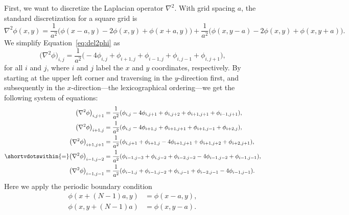 First, we want to discretize the Laplacian operator \(\nabla^2\).
With grid spacing \(a\), the standard discretization for a square grid is
%
\begin{equation}\label{eq:del2phi}
    \nabla^2 \phi(x, y) =
    \frac{ 1 }{ a^2 } \bigl(\phi(x - a, y) - 2 \phi(x, y) + \phi(x + a, y)\bigr) +
    \frac{ 1 }{ a^2 } \bigl(\phi(x, y - a) - 2 \phi(x, y) + \phi(x, y + a)\bigr).
\end{equation}
%
We simplify Equation~\eqref{eq:del2phi} as
%
\begin{equation}\label{eq:del2phisim}
    \bigl(\nabla^2 \phi\bigr)_{i, j} = \frac{1}{a^2} \bigl(
    -4 \phi_{i, j} + \phi_{i+1, j} + \phi_{i-1, j} + \phi_{i, j-1} + \phi_{i, j+1}
    \bigr),
\end{equation}
%
for all \(i\) and \(j\),
where \(i\) and \(j\) label the \(x\) and \(y\) coordinates, respectively.
By starting at the upper left corner and traversing in the \(y\)-direction first, and
subsequently in the \(x\)-direction---the lexicographical ordering---we get the following
system of equations:
%
\begin{align}
    \bigl(\nabla^2 \phi\bigr)_{i, j+1}   & = \frac{1}{a^2} (
    \phi_{i, j} - 4\phi_{i, j+1} + \phi_{i, j+2} + \phi_{i+1, j+1} + \phi_{i-1, j+1}
    ),                                                       \\
    \bigl(\nabla^2 \phi\bigr)_{i+1, j}   & = \frac{1}{a^2} (
    \phi_{i, j} - 4\phi_{i+1, j} + \phi_{i+1, j+1} + \phi_{i+1, j-1} + \phi_{i+2, j}
    ),                                                       \\
    \bigl(\nabla^2 \phi\bigr)_{i+1, j+1} & = \frac{1}{a^2} (
    \phi_{i, j+1} + \phi_{i+1, j} - 4\phi_{i+1, j+1} + \phi_{i+1, j+2} + \phi_{i+2, j+1}
    ),                                                       \\
    \shortvdotswithin{=} %
    \bigl(\nabla^2 \phi\bigr)_{i-1, j-2} & = \frac{1}{a^2} (
    \phi_{i-1, j-3} + \phi_{i, j-2} + \phi_{i-2, j-2} - 4\phi_{i-1, j-2} + \phi_{i-1, j-1}
    ),                                                       \\
    \bigl(\nabla^2 \phi\bigr)_{i-1, j-1} & = \frac{1}{a^2} (
    \phi_{i-1, j} + \phi_{i-1, j-2} + \phi_{i, j-1} + \phi_{i-2, j-1} - 4\phi_{i-1, j-1}
    ).\label{eq:delend}
\end{align}
%
Here we apply the periodic boundary condition
%
\begin{align}
    \phi(x + (N-1)a, y) & = \phi(x - a, y), \\
    \phi(x, y + (N-1)a) & = \phi(x, y - a).
\end{align}


